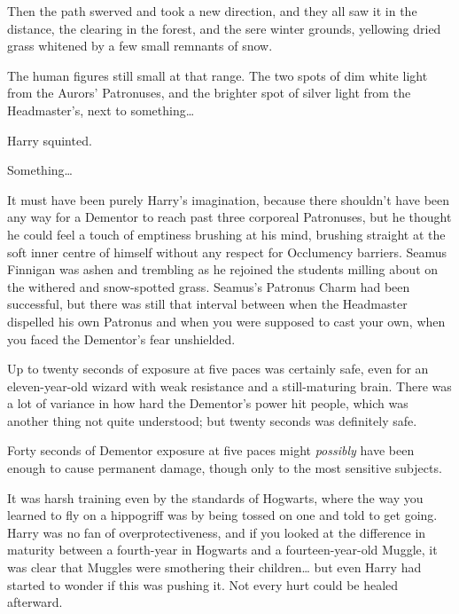 Then the path swerved and took a new direction, and they all saw it in the
distance, the clearing in the forest, and the sere winter grounds, yellowing
dried grass whitened by a few small remnants of snow.

The human figures still small at that range. The two spots of dim white light
from the Aurors' Patronuses, and the brighter spot of silver light from the
Headmaster's, next to something{\ldots}

Harry squinted.

Something{\ldots}

It must have been purely Harry's imagination, because there shouldn't have been
any way for a Dementor to reach past three corporeal Patronuses, but he thought
he could feel a touch of emptiness brushing at his mind, brushing straight at
the soft inner centre of himself without any respect for Occlumency barriers.
\later
Seamus Finnigan was ashen and trembling as he rejoined the students milling
about on the withered and snow-spotted grass. Seamus's Patronus Charm had been
successful, but there was still that interval between when the Headmaster
dispelled his own Patronus and when you were supposed to cast your own, when
you faced the Dementor's fear unshielded.

Up to twenty seconds of exposure at five paces was certainly safe, even for an
eleven-year-old wizard with weak resistance and a still-maturing brain. There
was a lot of variance in how hard the Dementor's power hit people, which was
another thing not quite understood; but twenty seconds was definitely safe.

Forty seconds of Dementor exposure at five paces might \emph{possibly} have
been enough to cause permanent damage, though only to the most sensitive
subjects.

It was harsh training even by the standards of Hogwarts, where the way you
learned to fly on a hippogriff was by being tossed on one and told to get
going. Harry was no fan of overprotectiveness, and if you looked at the
difference in maturity between a fourth-year in Hogwarts and a
fourteen-year-old Muggle, it was clear that Muggles were smothering their
children{\ldots} but even Harry had started to wonder if this was pushing it.
Not every hurt could be healed afterward.

